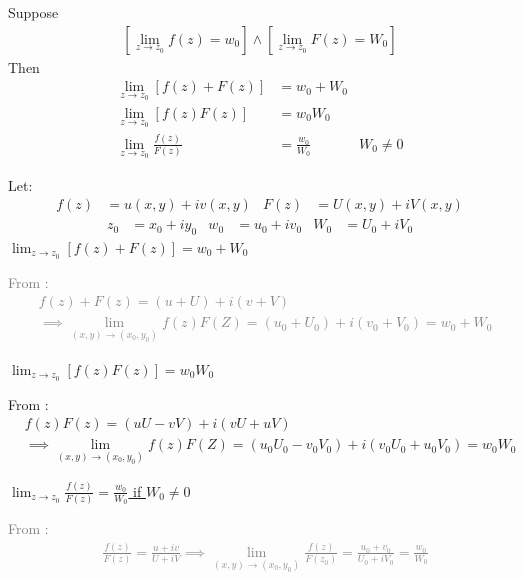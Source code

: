 \documentclass[12pt, english]{book}
\makeatletter
\renewenvironment{proof}[1][\proofname]{\par
	\pushQED{\qed}%
	\normalfont \topsep6\p@\@plus6\p@\relax
	\list{}{%
		\settowidth{\leftmargin}{\itshape\proofname:\hskip\labelsep}%
		\setlength{\labelwidth}{0pt}%
		\setlength{\itemindent}{-\leftmargin}%
		}%
	\item[\hskip\labelsep\itshape#1\@addpunct{:}]\ignorespaces
	}{\popQED\endlist\@endpefalse}
\makeatother
\begin{document}
	\begin{theorem}
		Suppose
		\begin{align*}
		\left[\lim_{z\rightarrow z_0} f(z) = w_0 \right] \land \left[\lim_{z\rightarrow z_0} F(z) = W_0 \right]
		\end{align*}
		Then
		\begin{align*}
			\lim_{z \rightarrow z_0} [f(z) + F(z)] &= w_0 + W_0 & \\
			\lim_{z \rightarrow z_0} [f(z)F(z)] &= w_0 W_0  & \\
			\lim_{z \rightarrow z_0} \frac{f(z)}{F(z)} &= \frac{w_0}{W_0} & W_0 \neq 0
		\end{align*}
		\label{Limit of f(z)+F(z) f(z)F(z) and f(z)/F(z) Theorem - Complex}
	\end{theorem}
	\begin{proof}
		Let: 
		\begin{align*}
			f(z) &= u(x,y) + iv(x,y) & F(z) &= U(x,y) + iV(x,y) 
		\end{align*}
		\begin{align*}
			z_0 &= x_0 + iy_0 	& w_0 &= u_0 + iv_0 & W_0 &= U_0 + iV_0
		\end{align*}
		\underline{$\lim_{z \rightarrow z_0} [f(z) + F(z)] = w_0 + W_0$}
		
		\textcolor{Grey}{
		From :
		\begin{align*}
			&f(z) + F(z) = (u + U) + i(v + V) \\
			&\implies \lim_{(x,y) \rightarrow (x_0, y_0)} f(z)F(Z) = (u_0 + U_0) + i(v_0 + V_0) = w_0 + W_0
		\end{align*}
		}
		
		\underline{$\lim_{z \rightarrow z_0} [f(z)F(z)] = w_0 W_0$}
		
		From :
		\begin{align*}
			&f(z)F(z) = (uU - vV) + i(vU + uV) \\
			&\implies \lim_{(x,y) \rightarrow (x_0, y_0)} f(z)F(Z) = (u_0 U_0 - v_0 V_0) + i(v_0 U_0 + u_0 V_0) = w_0 W_0
		\end{align*}
		
		\underline{$\lim_{z \rightarrow z_0} \frac{f(z)}{F(z)} = \frac{w_0}{W_0}$ if $W_0 \neq 0$}
		
		\textcolor{Grey}{
		From :
		\begin{align*}
			&\frac{f(z)}{F(z)} = \frac{u+iv}{U+iV} 
			\implies \lim_{(x, y) \rightarrow (x_0, y_0)} \frac{f(z)}{F(z_0)} = \frac{u_0 + v_0}{U_0 + iV_0} = \frac{w_0}{W_0}
		\end{align*}
		}
	\end{proof}
\end{document}
